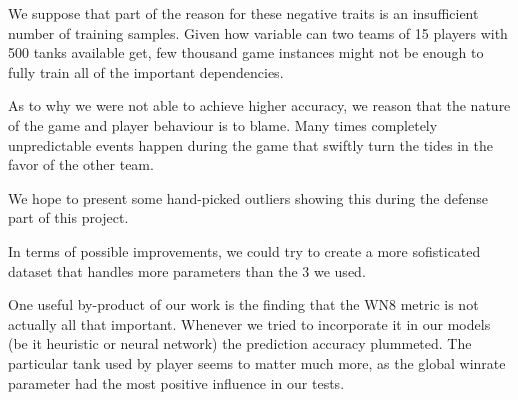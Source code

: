 \documentclass{report}
\begin{document}
We suppose that part of the reason for these negative traits is an insufficient number of training samples. Given how variable can two teams of 15 players with 500 tanks available get, few thousand game instances might not be enough to fully train all of the important dependencies.

As to why we were not able to achieve higher accuracy, we reason that the nature of the game and player behaviour is to blame. 
Many times completely unpredictable events happen during the game that swiftly turn the tides in the favor of the other team.

We hope to present some hand-picked outliers showing this during the defense part of this project.

In terms of possible improvements, we could try to create a more sofisticated dataset that handles more parameters than the 3 we used.

One useful by-product of our work is the finding that the WN8 metric is not actually all that important. Whenever we tried to incorporate it in our models (be it heuristic or neural network) the prediction accuracy plummeted. The particular tank used by player seems to matter much more, as the global winrate parameter had the most positive influence in our tests.
\end{document}
